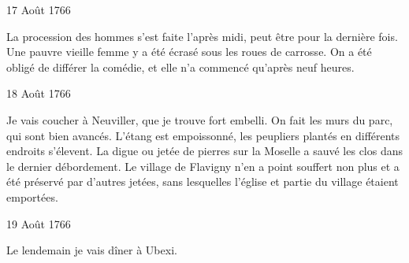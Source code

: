                      \begin{diary}{17 Août 1766}{}

                         La procession des
                           hommes s'est faite l'après midi,
                           peut être pour la dernière fois. Une pauvre
                           vieille femme y a été écrasé sous les roues de
                           carrosse. On a été obligé de différer la comédie,
                           et elle n'a commencé qu'après neuf heures. \bigskip


                     \end{diary}

                     \begin{diary}{18 Août 1766}{}

                         Je vais coucher à Neuviller, que je trouve
                           fort embelli. On fait les murs du parc, qui
                           sont bien avancés. L'étang est empoissonné,
                           les peupliers plantés en différents endroits s'élevent.
                           La digue ou jetée de pierres sur la Moselle a
                           sauvé les clos dans le dernier débordement.
                           Le village de Flavigny n'en a
                           point souffert non
                           plus et a été préservé par d'autres jetées,
                           sans lesquelles l’église et partie du village
                           étaient emportées. \bigskip


                     \end{diary}

                     \begin{diary}{19 Août 1766}{}

                         Le lendemain je vais dîner à
                              Ubexi. \bigskip


                     \end{diary}

